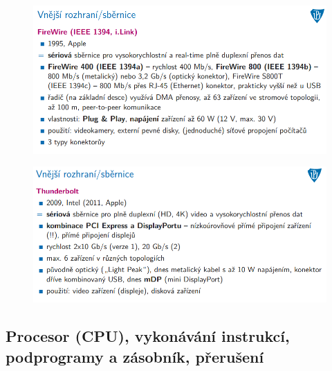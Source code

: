 \documentclass[10pt,a4paper]{article}
\begin{document}
\begin{figure} [h]
	\includegraphics[scale=0.65]{img/prvni_odstavec/otazka4/rozhrani_vnejsi6.png}	
\end{figure}

\begin{figure} [h]
	\includegraphics[scale=0.65]{img/prvni_odstavec/otazka4/rozhrani_vnejsi7.png}	
\end{figure}



\clearpage
\subsection{Procesor (CPU), vykonávání instrukcí, podprogramy a zásobník, přerušení}
\end{document}
